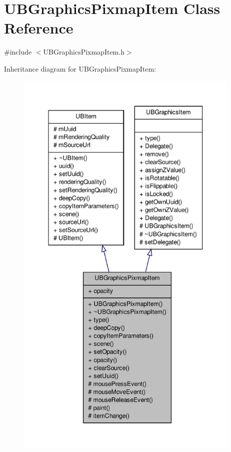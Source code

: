 \hypertarget{class_u_b_graphics_pixmap_item}{\section{U\-B\-Graphics\-Pixmap\-Item Class Reference}
\label{d1/d78/class_u_b_graphics_pixmap_item}
}


{\ttfamily \#include $<$U\-B\-Graphics\-Pixmap\-Item.\-h$>$}



Inheritance diagram for U\-B\-Graphics\-Pixmap\-Item\-:
\nopagebreak
\begin{figure}[H]
\begin{center}
\leavevmode
\includegraphics[height=550pt]{d8/d81/class_u_b_graphics_pixmap_item__inherit__graph}
\end{center}
\end{figure}



